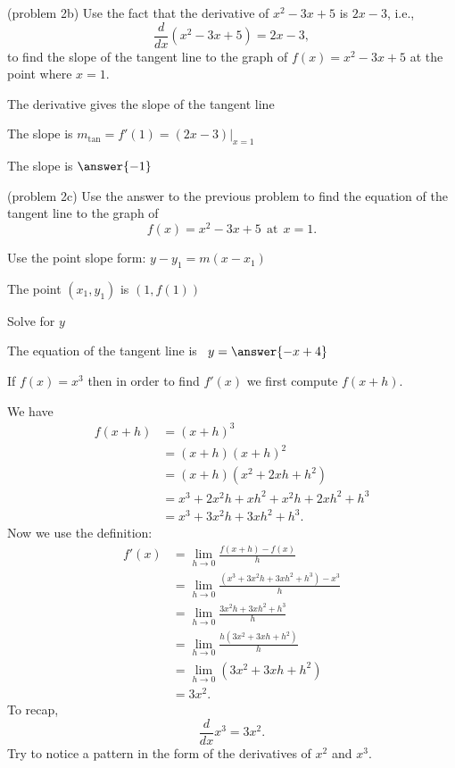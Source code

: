 \documentclass{ximera}
\begin{document}
\begin{problem}(problem 2b)
Use the fact that the derivative of $x^2 -3x + 5$ is $2x-3$,
i.e., 
\[
\frac{d}{dx}\left( x^2 - 3x + 5 \right) = 2x-3,
\]
to find the slope of the tangent line to the graph of 
$f(x) = x^2 - 3x + 5$ at the point where $x = 1$.\\
\begin{hint}
The derivative gives the slope of the tangent line
\end{hint}
\begin{hint}
The slope is $m_{\text{tan}} = f'(1) = (2x-3)\big|_{x=1}$
\end{hint}
The slope is $\answer{-1}$
\end{problem}

\begin{problem}(problem 2c)
Use the answer to the previous problem to find the equation of the tangent line to the graph of 
\[
f(x) = x^2 - 3x + 5 \ \ \text{at} \ \ x=1.
\]
\begin{hint}
Use the point slope form: $y-y_1 = m(x-x_1)$
\end{hint}
\begin{hint}
The point $(x_1,y_1)$ is $(1, f(1))$
\end{hint}
\begin{hint}
Solve for $y$
\end{hint}
The equation of the tangent line is \ $y = \answer{-x+4}$
\end{problem}




\begin{example}[example 3]
If $f(x) = x^3$ then in order to find $f'(x)$ we first compute $f(x+h)$.

We have
\begin{align*}
f(x+h) &= (x+h)^3  \\
       &= (x+h)(x+h)^2 \\
			&= (x+h)(x^2 + 2xh + h^2)\\
			&= x^3 + 2x^2h + xh^2 + x^2h + 2xh^2 + h^3\\
			&= x^3 + 3x^2h + 3xh^2 + h^3.
\end{align*}
Now we use the definition:
\begin{align*}
f'(x) &= \lim_{h \to 0} \frac{f(x+h)-f(x)}{h}\\[5pt]
&= \lim_{h \to 0} \frac{(x^3 + 3x^2h + 3xh^2 + h^3)- x^3}{h}\\[5pt]
&= \lim_{h \to 0} \frac{3x^2h + 3xh^2 + h^3}{h}\\[5pt]
&= \lim_{h \to 0} \frac{h(3x^2 + 3xh + h^2)}{h}\\[5pt]
&= \lim_{h \to 0} (3x^2 + 3xh + h^2) \\
&= 3x^2.
\end{align*}
To recap, 
\[
\frac{d}{dx}x^3 = 3x^2.
\]
Try to notice a pattern in the form of the derivatives of $x^2$ and $x^3$.

\end{example}
\end{document}
